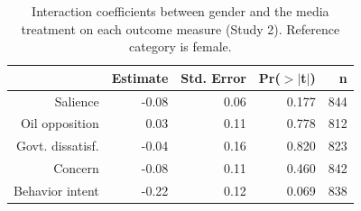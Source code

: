 \begin{table}[ht]
\centering
\caption{Interaction coefficients between gender and the media
             treatment on each outcome measure (Study 2). Reference category is
             female.} 
\label{tab:disruption_bygender2}
\begin{tabular}{rrrrr}
  \hline
 & Estimate & Std. Error & Pr($>$$|$t$|$) & n \\ 
  \hline
Salience & -0.08 & 0.06 & 0.177 & 844 \\ 
  Oil opposition & 0.03 & 0.11 & 0.778 & 812 \\ 
  Govt. dissatisf. & -0.04 & 0.16 & 0.820 & 823 \\ 
  Concern & -0.08 & 0.11 & 0.460 & 842 \\ 
  Behavior intent & -0.22 & 0.12 & 0.069 & 838 \\ 
   \hline
\end{tabular}
\end{table}
